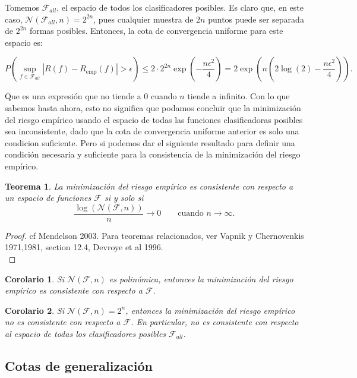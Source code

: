 \documentclass{article}
\newtheorem{thm}{Teorema}[subsection]
\newtheorem{cor}{Corolario}[thm]
\begin{document}
Tomemos $\mathcal{F}_{all}$, el espacio de todos los clasificadores posibles. Es claro que, en este caso, $\mathcal{N}(\mathcal{F}_{all}, n)=2^{2n}$,
pues cualquier muestra de $2n$ puntos puede ser separada de $2^{2n}$ formas posibles. Entonces, la cota de convergencia uniforme para este espacio
es:

\[
P\left(\sup_{f \in \mathcal{F}_{all}} |R(f) - R_{\text{emp}}(f)| > \epsilon \right) \leq
2\cdot 2^{2n} \exp\left(-\frac{n\epsilon^2}{4}\right) = 2\exp\left(n\left( 2\log(2) - \frac{n\epsilon^2}{4}\right)\right).
\]

Que es una expresión que no tiende a $0$ cuando $n$ tiende a infinito. Con lo que sabemos hasta ahora, esto no significa que podamos 
concluir que la minimización del riesgo empírico
usando el espacio de todas las funciones clasificadoras posibles sea inconsistente, dado que la cota de convergencia uniforme anterior
es solo una condicion suficiente. Pero si podemos dar el siguiente resultado para definir una condición necesaria y suficiente para
la consistencia de la minimización del riesgo empírico.
\begin{thm}
    La minimización del riesgo empírico es consistente con respecto a un espacio de funciones $\mathcal{F}$ si y solo si
    \[
    \frac{\log\left(\mathcal{N}(\mathcal{F}, n)\right)}{n} \rightarrow 0 \qquad \text{cuando } n \to \infty.
    \]
    
\end{thm}
\begin{proof}
    cf Mendelson 2003. Para teoremas relacionados, ver Vapnik y Chernovenkis 1971,1981, section 12.4, Devroye et al 1996.\\
\end{proof}

\begin{cor}
    Si $\mathcal{N}(\mathcal{F}, n)$ es polinómica, entonces la minimización del riesgo empírico es consistente con respecto a $\mathcal{F}$.\\
\end{cor}
\begin{cor}
    Si $\mathcal{N}(\mathcal{F}, n)=2^n$, entonces la minimización del riesgo empírico no es consistente con respecto a $\mathcal{F}$. En 
    particular, no es consistente con respecto al espacio de todas los clasificadores posibles $\mathcal{F}_{all}$.
\end{cor}

\subsection{Cotas de generalización}
\end{document}
